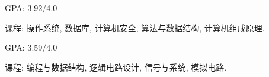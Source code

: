 \newcommand{\TUBentry}{
    \TUB
    \poswithprd{Introduction to 3D Scanning and Printing at TUB Winter University}{Jan 2018-Feb 2018}
    \begin{itemize}
        \item 
        Learned the basic of 3D scanning \& printing. Learned Blender for 3D modeling.
    \end{itemize}
}



\UM
{}
\begin{miniItemize}
    \item GPA: 3.92/4.0
    \item 课程:
        操作系统,
        数据库,
        计算机安全,
        算法与数据结构,
        计算机组成原理.
\end{miniItemize}

\SJTU
{}
\begin{miniItemize}
    \item GPA: 3.59/4.0
    \item 课程:
        编程与数据结构,
        逻辑电路设计,
        信号与系统,
        模拟电路.
\end{miniItemize}
